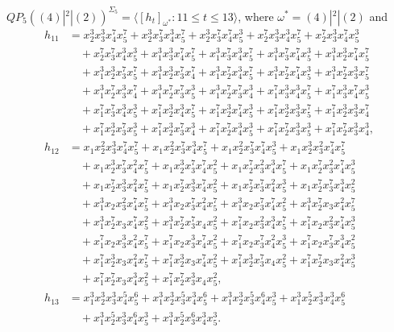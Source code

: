 \documentclass[reqno]{amsart}
\theoremstyle{plain}
\theoremstyle{definition}
\theoremstyle{plain}
\theoremstyle{definition}
\numberwithin{equation}{section}
\begin{document}
$QP_5((4)|^2|(2))^{\Sigma_5} = \langle [h_t]_{\omega^*} : 11 \leqslant t \leqslant 13 \rangle$, where $\omega^* = (4)|^2|(2)$ and 
\begin{align*}
h_{11} &= x_2^{3}x_3^{3}x_4^{7}x_5^{7} + x_2^{3}x_3^{7}x_4^{3}x_5^{7} + x_2^{3}x_3^{7}x_4^{7}x_5^{3} + x_2^{7}x_3^{3}x_4^{3}x_5^{7} + x_2^{7}x_3^{3}x_4^{7}x_5^{3}\\ &\quad + x_2^{7}x_3^{7}x_4^{3}x_5^{3} + x_1^{3}x_3^{3}x_4^{7}x_5^{7} + x_1^{3}x_3^{7}x_4^{3}x_5^{7} + x_1^{3}x_3^{7}x_4^{7}x_5^{3} + x_1^{3}x_2^{3}x_4^{7}x_5^{7}\\ &\quad + x_1^{3}x_2^{3}x_3^{7}x_5^{7} + x_1^{3}x_2^{3}x_3^{7}x_4^{7} + x_1^{3}x_2^{7}x_4^{3}x_5^{7} + x_1^{3}x_2^{7}x_4^{7}x_5^{3} + x_1^{3}x_2^{7}x_3^{3}x_5^{7}\\ &\quad + x_1^{3}x_2^{7}x_3^{3}x_4^{7} + x_1^{3}x_2^{7}x_3^{7}x_5^{3} + x_1^{3}x_2^{7}x_3^{7}x_4^{3} + x_1^{7}x_3^{3}x_4^{3}x_5^{7} + x_1^{7}x_3^{3}x_4^{7}x_5^{3}\\ &\quad + x_1^{7}x_3^{7}x_4^{3}x_5^{3} + x_1^{7}x_2^{3}x_4^{3}x_5^{7} + x_1^{7}x_2^{3}x_4^{7}x_5^{3} + x_1^{7}x_2^{3}x_3^{3}x_5^{7} + x_1^{7}x_2^{3}x_3^{3}x_4^{7}\\ &\quad + x_1^{7}x_2^{3}x_3^{7}x_5^{3} + x_1^{7}x_2^{3}x_3^{7}x_4^{3} + x_1^{7}x_2^{7}x_4^{3}x_5^{3} + x_1^{7}x_2^{7}x_3^{3}x_5^{3} + x_1^{7}x_2^{7}x_3^{3}x_4^{3},\\
h_{12} &= x_1x_2^{2}x_3^{3}x_4^{7}x_5^{7} + x_1x_2^{2}x_3^{7}x_4^{3}x_5^{7} + x_1x_2^{2}x_3^{7}x_4^{7}x_5^{3} + x_1x_2^{3}x_3^{2}x_4^{7}x_5^{7}\\ &\quad  + x_1x_2^{3}x_3^{7}x_4^{2}x_5^{7} + x_1x_2^{3}x_3^{7}x_4^{7}x_5^{2} + x_1x_2^{7}x_3^{2}x_4^{3}x_5^{7} + x_1x_2^{7}x_3^{2}x_4^{7}x_5^{3}\\ &\quad  + x_1x_2^{7}x_3^{3}x_4^{2}x_5^{7} + x_1x_2^{7}x_3^{3}x_4^{7}x_5^{2} + x_1x_2^{7}x_3^{7}x_4^{2}x_5^{3} + x_1x_2^{7}x_3^{7}x_4^{3}x_5^{2}\\ &\quad  + x_1^{3}x_2x_3^{2}x_4^{7}x_5^{7} + x_1^{3}x_2x_3^{7}x_4^{2}x_5^{7} + x_1^{3}x_2x_3^{7}x_4^{7}x_5^{2} + x_1^{3}x_2^{7}x_3x_4^{2}x_5^{7}\\ &\quad  + x_1^{3}x_2^{7}x_3x_4^{7}x_5^{2} + x_1^{3}x_2^{7}x_3^{7}x_4x_5^{2} + x_1^{7}x_2x_3^{2}x_4^{3}x_5^{7} + x_1^{7}x_2x_3^{2}x_4^{7}x_5^{3}\\ &\quad  + x_1^{7}x_2x_3^{3}x_4^{2}x_5^{7} + x_1^{7}x_2x_3^{3}x_4^{7}x_5^{2} + x_1^{7}x_2x_3^{7}x_4^{2}x_5^{3} + x_1^{7}x_2x_3^{7}x_4^{3}x_5^{2}\\ &\quad  + x_1^{7}x_2^{3}x_3x_4^{2}x_5^{7} + x_1^{7}x_2^{3}x_3x_4^{7}x_5^{2} + x_1^{7}x_2^{3}x_3^{7}x_4x_5^{2} + x_1^{7}x_2^{7}x_3x_4^{2}x_5^{3}\\ &\quad  + x_1^{7}x_2^{7}x_3x_4^{3}x_5^{2} + x_1^{7}x_2^{7}x_3^{3}x_4x_5^{2},\\
h_{13} &= x_1^{3}x_2^{3}x_3^{3}x_4^{5}x_5^{6} + x_1^{3}x_2^{3}x_3^{5}x_4^{3}x_5^{6} + x_1^{3}x_2^{3}x_3^{5}x_4^{6}x_5^{3} + x_1^{3}x_2^{5}x_3^{3}x_4^{3}x_5^{6}\\ &\quad + x_1^{3}x_2^{5}x_3^{3}x_4^{6}x_5^{3} + x_1^{3}x_2^{5}x_3^{6}x_4^{3}x_5^{3}.
\end{align*}
\end{document}
